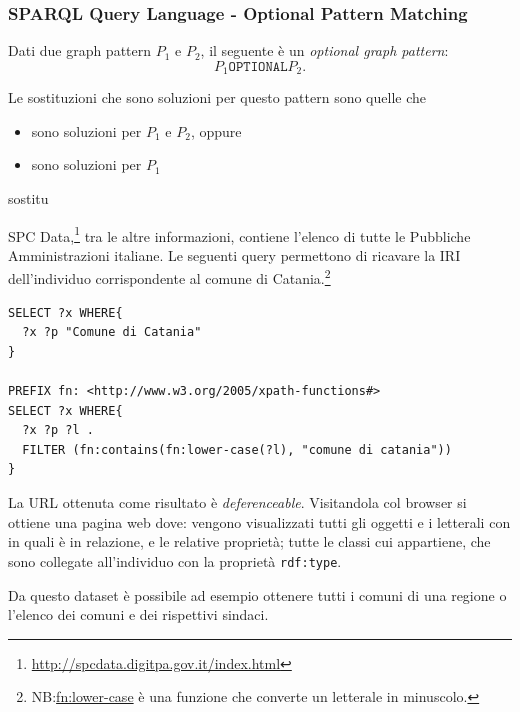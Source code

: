 \documentclass[8pt]{beamer}
\begin{document}
\begin{frame}[fragile]
 \frametitle{SPARQL Query Language - Optional Pattern Matching}

 Dati due graph pattern $P_1$ e $P_2$, il seguente \`e un \emph{optional graph pattern}:
\[
 P_1 \mathtt{OPTIONAL} P_2 .
\]

 Le sostituzioni che sono soluzioni per questo pattern sono quelle che
\begin{itemize}
 \item sono soluzioni per $P_1$ e $P_2$, oppure
 \item sono soluzioni per $P_1$
\end{itemize}
 
 sostitu
 
 
 SPC Data,\footnote{\url{http://spcdata.digitpa.gov.it/index.html}} tra le altre informazioni, contiene l'elenco di tutte le Pubbliche 
 Amministrazioni italiane. Le seguenti query permettono di ricavare la IRI 
 dell'individuo corrispondente al comune di Catania.\footnote{ NB:\url{fn:lower-case} \`e una funzione che converte un letterale
 in minuscolo.} 
 
\begin{Verbatim}[fontsize=\small]
SELECT ?x WHERE{
  ?x ?p "Comune di Catania"
} 

PREFIX fn: <http://www.w3.org/2005/xpath-functions#> 
SELECT ?x WHERE{
  ?x ?p ?l .
  FILTER (fn:contains(fn:lower-case(?l), "comune di catania"))
} 
\end{Verbatim}

La URL ottenuta come risultato \`e \emph{deferenceable}.
Visitandola col browser si ottiene una pagina web dove: vengono 
visualizzati tutti gli oggetti e i letterali con in quali
\`e in relazione, e le relative propriet\`a; tutte le classi cui appartiene, che sono
collegate all'individuo con la propriet\`a \texttt{rdf:type}.
\vspace{\baselineskip}

Da questo dataset \`e possibile ad esempio ottenere
tutti i comuni di una regione o l'elenco dei comuni e dei rispettivi
sindaci.
\end{frame}
\end{document}
